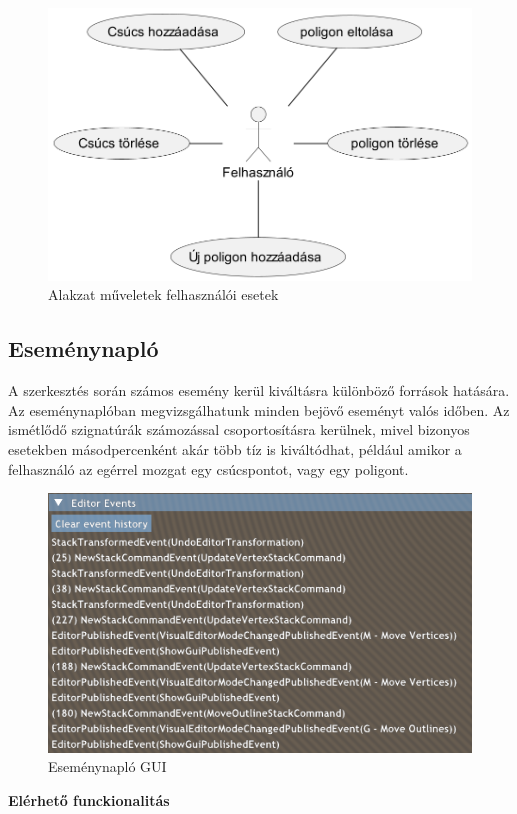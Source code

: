 \begin{figure}[H]
    \centering
    \includegraphics[width=.6\linewidth]{images/usecase_polygon_actions.png}
    \caption{Alakzat műveletek felhasználói esetek}
    \label{fig:usecase_polygon_actions-1}
\end{figure}

\subsection{Eseménynapló}

A szerkesztés során számos esemény kerül kiváltásra különböző források hatására. Az eseménynaplóban megvizsgálhatunk minden bejövő eseményt valós időben. Az ismétlődő szignatúrák számozással csoportosításra kerülnek, mivel bizonyos esetekben másodpercenként akár több tíz is kiváltódhat, például amikor a felhasználó az egérrel mozgat egy csúcspontot, vagy egy poligont.

\begin{figure}[H]
    \centering
    \includegraphics[width=1\linewidth]{images/editor_events.png}
    \caption{Eseménynapló GUI}
    \label{fig:editor_events-1}
\end{figure}


\textbf{Elérhető funckionalitás}

